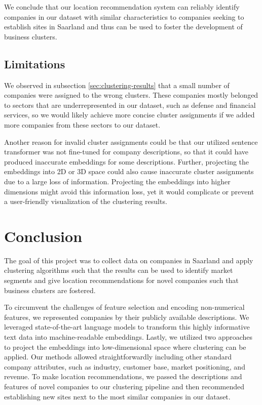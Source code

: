 \documentclass[conference]{IEEEtran}
\begin{document}
We conclude that our location recommendation system can reliably identify companies in our dataset with similar characteristics to companies seeking to establish sites in Saarland and thus can be used to foster the development of business clusters.

\subsection{Limitations}
We observed in subsection \ref{sec:clustering-results} that a small number of companies were assigned to the wrong clusters. These companies mostly belonged to sectors that are underrepresented in our dataset, such as defense and financial services, so we would likely achieve more concise cluster assignments if we added more companies from these sectors to our dataset.

Another reason for invalid cluster assignments could be that our utilized sentence transformer was not fine-tuned for company descriptions, so that it could have produced inaccurate embeddings for some descriptions. Further, projecting the embeddings into 2D or 3D space could also cause inaccurate cluster assignments due to a large loss of information. Projecting the embeddings into higher dimensions might avoid this information loss, yet it would complicate or prevent a user-friendly visualization of the clustering results.

\section{Conclusion}
The goal of this project was to collect data on companies in Saarland and apply clustering algorithms such that the results can be used to identify market segments and give location recommendations for novel companies such that business clusters are fostered.

To circumvent the challenges of feature selection and encoding non-numerical features, we represented companies by their publicly available descriptions. We leveraged state-of-the-art language models to transform this highly informative text data into machine-readable embeddings. Lastly, we utilized two approaches to project the embeddings into low-dimensional space where clustering can be applied.
Our methods allowed straightforwardly including other standard company attributes, such as industry, customer base, market positioning, and revenue. 
To make location recommendations, we passed the descriptions and features of novel companies to our clustering pipeline and then recommended establishing new sites next to the most similar companies in our dataset.
\end{document}

